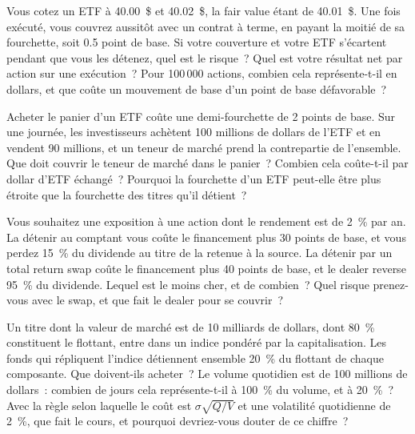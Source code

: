 \begin{question}\label{iq:iv2:etfs-futures-and-index-arbitrage:22}
Vous cotez un ETF à 40.00~\$ et 40.02~\$, la fair value étant de 40.01~\$. Une fois exécuté, vous couvrez aussitôt avec un contrat à terme, en payant la moitié de sa fourchette, soit 0.5 point de base. Si votre couverture et votre ETF s'écartent pendant que vous les détenez, quel est le risque~? Quel est votre résultat net par action sur une exécution~? Pour 100\,000 actions, combien cela représente-t-il en dollars, et que coûte un mouvement de base d'un point de base défavorable~?
\end{question}

\begin{question}\label{iq:iv2:etfs-futures-and-index-arbitrage:23}
Acheter le panier d'un ETF coûte une demi-fourchette de 2 points de base. Sur une journée, les investisseurs achètent 100 millions de dollars de l'ETF et en vendent 90 millions, et un teneur de marché prend la contrepartie de l'ensemble. Que doit couvrir le teneur de marché dans le panier~? Combien cela coûte-t-il par dollar d'ETF échangé~? Pourquoi la fourchette d'un ETF peut-elle être plus étroite que la fourchette des titres qu'il détient~?
\end{question}

\begin{question}\label{iq:iv2:etfs-futures-and-index-arbitrage:24}
Vous souhaitez une exposition à une action dont le rendement est de 2~\% par an. La détenir au comptant vous coûte le financement plus 30 points de base, et vous perdez 15~\% du dividende au titre de la retenue à la source. La détenir par un total return swap coûte le financement plus 40 points de base, et le dealer reverse 95~\% du dividende. Lequel est le moins cher, et de combien~? Quel risque prenez-vous avec le swap, et que fait le dealer pour se couvrir~?
\end{question}

\begin{question}\label{iq:iv2:etfs-futures-and-index-arbitrage:25}
Un titre dont la valeur de marché est de 10 milliards de dollars, dont 80~\% constituent le flottant, entre dans un indice pondéré par la capitalisation. Les fonds qui répliquent l'indice détiennent ensemble 20~\% du flottant de chaque composante. Que doivent-ils acheter~? Le volume quotidien est de 100 millions de dollars~: combien de jours cela représente-t-il à 100~\% du volume, et à 20~\%~? Avec la règle selon laquelle le coût est $\sigma\sqrt{Q/V}$ et une volatilité quotidienne de 2~\%, que fait le cours, et pourquoi devriez-vous douter de ce chiffre~?
\end{question}

